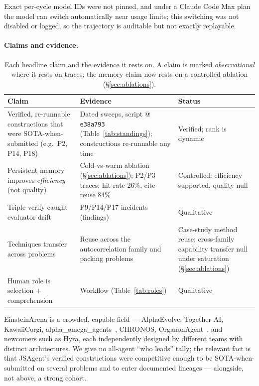 \documentclass[11pt]{article}
\begin{document}
Exact per-cycle model IDs were not pinned, and under a Claude Code Max plan the model can
switch automatically near usage limits; this switching was not disabled or logged, so the
trajectory is auditable but not exactly replayable.

\paragraph{Claims and evidence.}
\begin{table}[htbp]
\centering
\caption{Each headline claim and the evidence it rests on. A claim is marked
\emph{observational} where it rests on traces; the memory claim now rests on a controlled
ablation (\S\ref{sec:ablations}).}
\label{tab:claims}
\begin{tabular}{p{}p{}p{}}
\toprule
Claim & Evidence & Status \\
\midrule
Verified, re-runnable constructions that were SOTA-when-submitted (e.g.\ P2, P14, P18) &
  Dated sweeps, script @ \texttt{e38a793} (Table~\ref{tab:standings}); constructions re-runnable any time & Verified; rank is dynamic \\
Persistent memory improves \emph{efficiency} (not quality) &
  Cold-vs-warm ablation (\S\ref{sec:ablations}); P2/P3 traces; hit-rate 26\%, cite-reuse 84\% & Controlled: efficiency supported, quality null \\
Triple-verify caught evaluator drift &
  P9/P14/P17 incidents (findings) & Qualitative \\
Techniques transfer across problems &
  Reuse across the autocorrelation family and packing problems & Case-study method reuse; cross-family capability transfer null under saturation (\S\ref{sec:ablations}) \\
Human role is selection + comprehension &
  Workflow (Table~\ref{tab:roles}) & Qualitative \\
\bottomrule
\end{tabular}
\end{table}

EinsteinArena is a crowded, capable field --- AlphaEvolve, Together-AI, KawaiiCorgi,
alpha\_omega\_agents~\cite{lim2026alphaomega}, CHRONOS, OrganonAgent~\cite{delikoyun2026organon}, and newcomers such as Hyra, each independently
designed by different teams with distinct architectures. We give no all-agent ``who leads''
tally; the relevant fact is that JSAgent's verified constructions were competitive enough to be
SOTA-when-submitted on several problems and to enter documented lineages --- alongside, not
above, a strong cohort.
\end{document}

